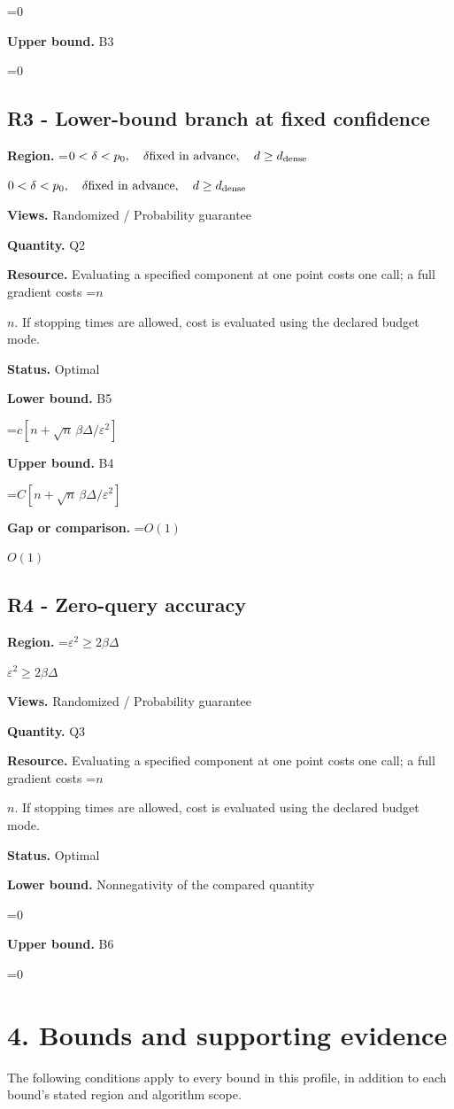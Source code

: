 \documentclass[10pt,a4paper]{article}
\newcommand{\AtlasMath}[1]{\par\begingroup\centering\setbox0=\hbox{$\displaystyle #1$}\ifdim\wd0>1.4\linewidth\typeout{ATLAS WIDE FORMULA: \the\wd0}\fi\ifdim\wd0>\linewidth\resizebox{\linewidth}{!}{\box0}\else\box0\fi\par\endgroup}
\newcommand{\AtlasInlineMath}[1]{\begingroup\setbox0=\hbox{$#1$}\ifdim\wd0>.4\linewidth\endgroup\AtlasMath{#1}\else\endgroup$#1$\fi}
\begin{document}
\AtlasMath{0}
\textbf{Upper bound.} B3

\AtlasMath{0}
\subsection{R3 - Lower-bound branch at fixed confidence}
\textbf{Region.} \AtlasInlineMath{0<\delta<p_0,\quad\delta\text{fixed in advance},\quad d\ge d_{\rm dense}}

\textbf{Views.} Randomized / Probability guarantee

\textbf{Quantity.} Q2

\textbf{Resource.} Evaluating a specified component at one point costs one call; a full gradient costs \AtlasInlineMath{n}. If stopping times are allowed, cost is evaluated using the declared budget mode.

\textbf{Status.} Optimal

\textbf{Lower bound.} B5

\AtlasMath{c[n+\sqrt n\,\beta\Delta/\varepsilon^2]}
\textbf{Upper bound.} B4

\AtlasMath{C[n+\sqrt n\,\beta\Delta/\varepsilon^2]}
\textbf{Gap or comparison.} \AtlasInlineMath{O(1)}

\subsection{R4 - Zero-query accuracy}
\textbf{Region.} \AtlasInlineMath{\varepsilon^2\ge2\beta\Delta}

\textbf{Views.} Randomized / Probability guarantee

\textbf{Quantity.} Q3

\textbf{Resource.} Evaluating a specified component at one point costs one call; a full gradient costs \AtlasInlineMath{n}. If stopping times are allowed, cost is evaluated using the declared budget mode.

\textbf{Status.} Optimal

\textbf{Lower bound.} Nonnegativity of the compared quantity

\AtlasMath{0}
\textbf{Upper bound.} B6

\AtlasMath{0}
\section{4. Bounds and supporting evidence}
The following conditions apply to every bound in this profile, in addition to each bound's stated region and algorithm scope.
\end{document}
